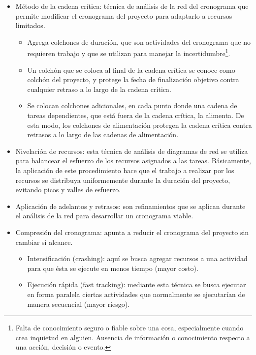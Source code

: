 \documentclass[a4paper,twosides]{article}
\newlength{\wideitemsep}
\let\olditem\item
\renewcommand{\item}{\setlength{\itemsep}{\wideitemsep}\olditem}
\begin{document}
\begin{itemize}
\item Método de la cadena crítica: técnica de análisis de la red del cronograma que permite modificar el cronograma del proyecto para adaptarlo a recursos limitados.
\begin{itemize}
\item Agrega colchones de duración, que son actividades del cronograma que no requieren trabajo y que se utilizan para manejar la incertidumbre\footnote{Falta de conocimiento seguro o fiable sobre una cosa, especialmente cuando crea inquietud en alguien. Ausencia de información o conocimiento respecto a una acción, decisión o evento.}.
\item Un colchón que se coloca al final de la cadena crítica se conoce como colchón del proyecto, y protege la fecha de finalización objetivo contra cualquier retraso a lo largo de la cadena crítica.
\item Se colocan colchones adicionales, en cada punto donde una cadena de tareas dependientes, que está fuera de la cadena crítica, la alimenta. De esta modo, los colchones de alimentación protegen la cadena crítica contra retrasos a lo largo de las cadenas de alimentación.
\end{itemize}
\item Nivelación de recursos: esta técnica de análisis de diagramas de red se utiliza para balancear el esfuerzo de los recursos asignados a las tareas. Básicamente, la aplicación de este procedimiento hace que el trabajo a realizar por los recursos se distribuya uniformemente durante la duración del proyecto, evitando picos y valles de esfuerzo.
\item Aplicación de adelantos y retrasos: son refinamientos que se aplican durante el análisis de la red para desarrollar un cronograma viable.
\item Compresión del cronograma: apunta a reducir el cronograma del proyecto sin cambiar si alcance.
\begin{itemize}
\item Intensificación (crashing): aquí se busca agregar recursos a una actividad para que ésta se ejecute en menos tiempo (mayor costo).
\item Ejecución rápida (fast tracking): mediante esta técnica se busca ejecutar en forma paralela ciertas actividades que normalmente se ejecutarían de manera secuencial (mayor riesgo).
\end{itemize}
\end{itemize}
\end{document}
